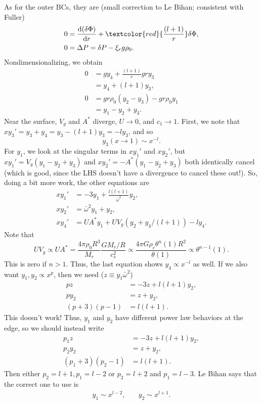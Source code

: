\documentclass[11pt,
        usenames, %
        twocolumn,
        landscape,
        dvipsnames %
    ]{article}
\newcommand*{\rd}[2]{\frac{\mathrm{d}#1}{\mathrm{d}#2}}
\newcommand*{\p}[1]{\left(#1\right)}
\begin{document}
As for the outer BCs, they are (small correction to Le Bihan; consistent with
Fuller)
\begin{align}
    0 &= \rd{(\delta \Phi)}{r} + \textcolor{red}{\frac{(l + 1)}{r}}\delta \Phi,\\
    0 &= \Delta P = \delta P - \xi_r g\rho_0.
\end{align}
Nondimensionalizing, we obtain
\begin{align}
    0 &= gy_4 + \frac{(l + 1)}{r}gry_3\nonumber\\
        &= y_4 + (l + 1)y_3,\\
    0 &= gr\rho_0 (y_2 - y_3) - gr\rho_0 y_1\nonumber\\
        &= y_1 - y_2 + y_3.
\end{align}
Near the surface, $V_g$ and $A^*$ diverge, $U \to 0$, and $c_1 \to 1$. First, we
note that $xy_3' = y_3 + y_4 = y_3 - (l + 1)y_3 = -ly_3$, and so
\begin{equation}
    y_3\p{x \to 1} \sim x^{-l}.
\end{equation}
For $y_1$, we look at the singular terms in $xy_1'$ and $xy_2'$, but $xy_1' =
V_g\p{y_1 - y_2 + y_3}$ and $xy_2' = -A^*\p{y_1 - y_2 + y_3}$ both identically
cancel (which is good, since the LHS doesn't have a divergence to cancel these
out!). So, doing a bit more work, the other equations are
\begin{align}
    xy_1' &= -3y_1 + \frac{l(l+1)}{\bar{\omega}^2}y_2,\\
    xy_2' &= \bar{\omega}^2y_1 + y_2,\\
    xy_4' &= UA^*y_1 + UV_g(y_2 + y_4 / (l + 1)) - ly_4.
\end{align}
Note that
\begin{equation}
    UV_g \propto UA^* = \frac{4\pi \rho_0 R^3}{M_r}\frac{GM_r/R}{c_s^2}
        \propto \frac{4\pi G\rho_c\theta^n(1) R^2}{\theta(1)}
        \propto \theta^{n - 1}(1).
\end{equation}
This is zero if $n > 1$. Thus, the last equation shows $y_4 \propto x^{-l}$ as
well. If we also want $y_1, y_2 \propto x^{p}$, then we need ($z \equiv
y_1\bar{\omega}^2$)
\begin{align}
    pz &= -3z + l(l+1)y_2,\\
    py_2 &= z + y_2,\\
    (p+3)(p-1) &= l(l+1).
\end{align}
This doesn't work! Thus, $y_1$ and $y_2$ have different power law behaviors at
the edge, so we should instead write
\begin{align}
    p_1z &= -3z + l(l+1)y_2,\\
    p_2y_2 &= z + y_2,\\
    (p_1+3)(p_2-1) &= l(l+1).
\end{align}
Then either $p_2 = l + 1, p_1 = l - 2$ or $p_2 = l + 2$ and $p_1 = l - 3$. Le
Bihan says that the correct one to use is
\begin{align}
    y_1 \sim x^{l - 2}, & \quad y_2 \sim x^{l + 1}.
\end{align}
\end{document}
